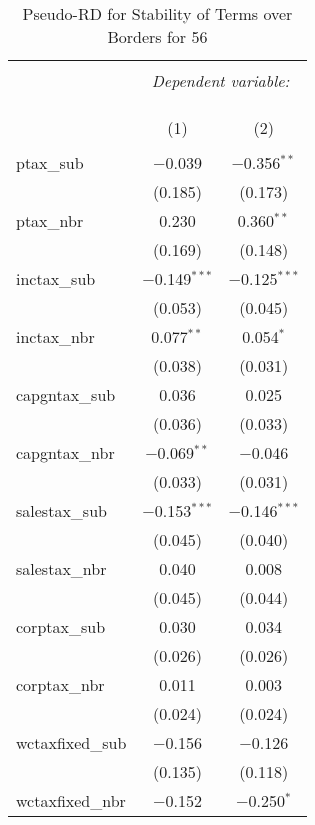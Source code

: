 
\begin{table}[!htbp] \centering 
  \caption{Pseudo-RD for Stability of Terms over Borders for  56} 
  \label{} 
\begin{tabular}{@{\extracolsep{5pt}}lcc} 
\\[-1.8ex]\hline 
\hline \\[-1.8ex] 
 & \multicolumn{2}{c}{\textit{Dependent variable:}} \\ 
\cline{2-3} 
\\[-1.8ex] & \multicolumn{2}{c}{ } \\ 
\\[-1.8ex] & (1) & (2)\\ 
\hline \\[-1.8ex] 
 ptax\_sub & $-$0.039 & $-$0.356$^{**}$ \\ 
  & (0.185) & (0.173) \\ 
  ptax\_nbr & 0.230 & 0.360$^{**}$ \\ 
  & (0.169) & (0.148) \\ 
  inctax\_sub & $-$0.149$^{***}$ & $-$0.125$^{***}$ \\ 
  & (0.053) & (0.045) \\ 
  inctax\_nbr & 0.077$^{**}$ & 0.054$^{*}$ \\ 
  & (0.038) & (0.031) \\ 
  capgntax\_sub & 0.036 & 0.025 \\ 
  & (0.036) & (0.033) \\ 
  capgntax\_nbr & $-$0.069$^{**}$ & $-$0.046 \\ 
  & (0.033) & (0.031) \\ 
  salestax\_sub & $-$0.153$^{***}$ & $-$0.146$^{***}$ \\ 
  & (0.045) & (0.040) \\ 
  salestax\_nbr & 0.040 & 0.008 \\ 
  & (0.045) & (0.044) \\ 
  corptax\_sub & 0.030 & 0.034 \\ 
  & (0.026) & (0.026) \\ 
  corptax\_nbr & 0.011 & 0.003 \\ 
  & (0.024) & (0.024) \\ 
  wctaxfixed\_sub & $-$0.156 & $-$0.126 \\ 
  & (0.135) & (0.118) \\ 
  wctaxfixed\_nbr & $-$0.152 & $-$0.250$^{*}$ \\ 

\end{tabular}
\end{table}
